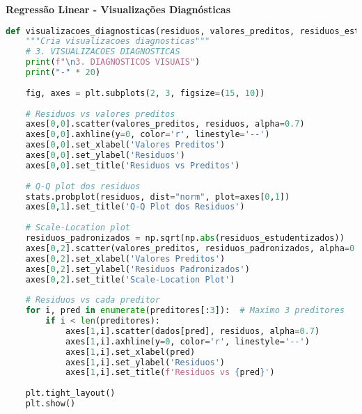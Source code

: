 \begin{examplebox}
\textbf{Regressão Linear - Visualizações Diagnósticas}

\begin{lstlisting}[language=Python]
def visualizacoes_diagnosticas(residuos, valores_preditos, residuos_estudentizados, dados, preditores):
    """Cria visualizacoes diagnosticas"""
    # 3. VISUALIZACOES DIAGNOSTICAS
    print(f"\n3. DIAGNOSTICOS VISUAIS")
    print("-" * 20)
    
    fig, axes = plt.subplots(2, 3, figsize=(15, 10))
    
    # Residuos vs valores preditos
    axes[0,0].scatter(valores_preditos, residuos, alpha=0.7)
    axes[0,0].axhline(y=0, color='r', linestyle='--')
    axes[0,0].set_xlabel('Valores Preditos')
    axes[0,0].set_ylabel('Residuos')
    axes[0,0].set_title('Residuos vs Preditos')
    
    # Q-Q plot dos residuos
    stats.probplot(residuos, dist="norm", plot=axes[0,1])
    axes[0,1].set_title('Q-Q Plot dos Residuos')
    
    # Scale-Location plot
    residuos_padronizados = np.sqrt(np.abs(residuos_estudentizados))
    axes[0,2].scatter(valores_preditos, residuos_padronizados, alpha=0.7)
    axes[0,2].set_xlabel('Valores Preditos')
    axes[0,2].set_ylabel('Residuos Padronizados')
    axes[0,2].set_title('Scale-Location Plot')
    
    # Residuos vs cada preditor
    for i, pred in enumerate(preditores[:3]):  # Maximo 3 preditores
        if i < len(preditores):
            axes[1,i].scatter(dados[pred], residuos, alpha=0.7)
            axes[1,i].axhline(y=0, color='r', linestyle='--')
            axes[1,i].set_xlabel(pred)
            axes[1,i].set_ylabel('Residuos')
            axes[1,i].set_title(f'Residuos vs {pred}')
    
    plt.tight_layout()
    plt.show()
\end{lstlisting}
\end{examplebox}

